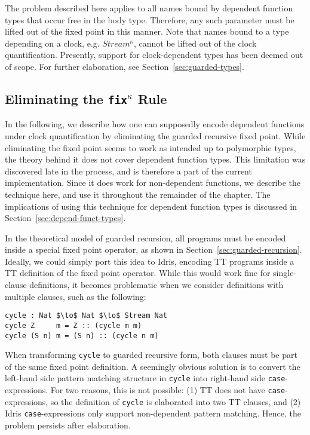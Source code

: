 The problem described here applies to all names bound by dependent function
types that occur free in the body type. Therefore, any such parameter must be
lifted out of the fixed point in this manner. Note that names bound to a type
depending on a clock, e.g. $Stream^{\kappa}$, cannot be lifted out of the clock
quantification. Presently, support for clock-dependent types has been deemed out
of scope. For further elaboration, see Section~\ref{sec:guarded-types}.

\subsection{Eliminating the \texttt{fix$^\kappa$} Rule}
\label{sec:fixkappa-rule}
In the following, we describe how one can supposedly encode dependent functions
under clock quantification by eliminating the guarded recursive fixed
point. While eliminating the fixed point seems to work as intended up to polymorphic
types, the theory behind it does not cover dependent function types. This
limitation was discovered late in the process, and is therefore a part of the
current implementation. Since it does work for non-dependent functions, we
describe the technique here, and use it throughout the remainder of the
chapter. The implications of using this technique for dependent function types
is discussed in Section~\ref{sec:depend-funct-types}.

In the theoretical model of guarded recursion, all programs must be encoded
inside a special fixed point operator, as shown in
Section~\ref{sec:guarded-recursion}. Ideally, we could simply port this idea to
Idris, encoding TT programs inside a TT definition of the fixed point
operator. While this would work fine for single-clause definitions, it becomes
problematic when we consider definitions with multiple clauses, such as the
following: 

\begin{lstlisting}[mathescape]
cycle : Nat $\to$ Nat $\to$ Stream Nat
cycle Z     m = Z :: (cycle m m)
cycle (S n) m = (S n) :: (cycle n m)
\end{lstlisting}

When transforming \texttt{cycle} to guarded recursive form, both clauses must be
part of the same fixed point definition. A seemingly obvious solution is to
convert the left-hand side pattern matching structure in \texttt{cycle} into
right-hand side \texttt{case}-expressions. For two reasons, this is not
possible: (1) TT does not have \texttt{case}-expressions, so the definition of
\texttt{cycle} is elaborated into two TT clauses, and (2) Idris
\texttt{case}-expressions only support non-dependent pattern matching. Hence,
the problem persists after elaboration.

